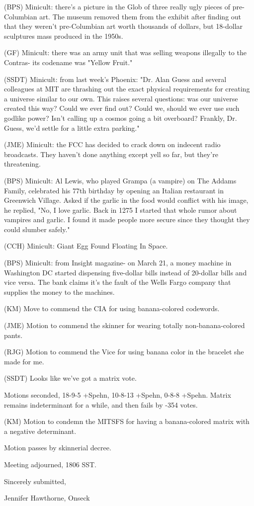 \documentclass[12pt]{article}
\begin{document}
(BPS) Minicult: there's a picture in the Glob of three really ugly pieces of pre-Columbian art. The museum removed them from the exhibit after finding out that they weren't pre-Columbian art worth thousands of dollars, but 18-dollar sculptures mass produced in the 1950s.

(GF) Minicult: there was an army unit that was selling weapons illegally to the Contras- its codename was "Yellow Fruit."

(SSDT) Minicult: from last week's Phoenix: "Dr. Alan Guess and several colleagues at MIT are thrashing out the exact physical requirements for creating a universe similar to our own. This raises several questions: was our universe created this way? Could we ever find out? Could we, should we ever use such godlike power? Isn't calling up a cosmos going a bit overboard? Frankly, Dr. Guess, we'd settle for a little extra parking."

(JME) Minicult: the FCC has decided to crack down on indecent radio broadcasts. They haven't done anything except yell so far, but they're threatening.

(BPS) Minicult: Al Lewis, who played Grampa (a vampire) on The Addams Family, celebrated his 77th birthday by opening an Italian restaurant in Greenwich Village. Asked if the garlic in the food would conflict with his image, he replied, "No, I love garlic. Back in 1275 I started that whole rumor about vampires and garlic. I found it made people more secure since they thought they could slumber safely."

(CCH) Minicult: Giant Egg Found Floating In Space.

(BPS) Minicult: from Insight magazine- on March 21, a money machine in Washington DC started dispensing five-dollar bills instead of 20-dollar bills and vice versa. The bank claims it's the fault of the Wells Fargo company that supplies the money to the machines.

(KM) Move to commend the CIA for using banana-colored codewords.

(JME) Motion to commend the skinner for wearing totally non-banana-colored pants.

(RJG) Motion to commend the Vice for using banana color in the bracelet she made for me.

(SSDT) Looks like we've got a matrix vote.

Motions seconded, 18-9-5 +Spehn, 10-8-13 +Spehn, 0-8-8 +Spehn. Matrix remains indeterminant for a while, and then fails by -354 votes.

(KM) Motion to condemn the MITSFS for having a banana-colored matrix with a negative determinant.

Motion passes by skinnerial decree.

\vspace{12pt}

\noindent
Meeting adjourned, 1806 SST.

\vspace{18pt}

\centerline{Sincerely submitted,}
\centerline{Jennifer Hawthorne, Onseck}
\end{document}
